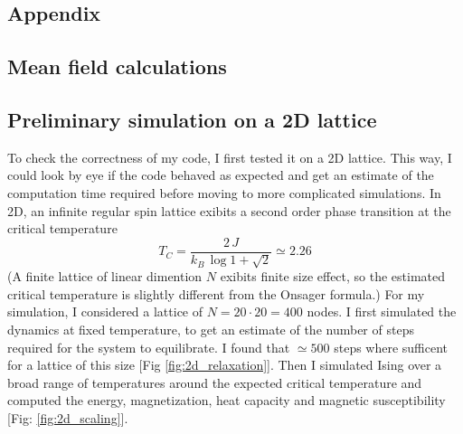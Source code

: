 \newpage
\subsection*{Appendix}
\subsection*{Mean field calculations} \label{app:mean_field}
{\small






}
\subsection*{Preliminary simulation on a 2D lattice}
{\small
To check the correctness of my code, I first tested it on a 2D lattice. This way, I could look by eye if the code behaved as expected and get an estimate of the computation time required before moving to more complicated simulations. 
In 2D, an infinite regular spin lattice exibits a second order phase transition at the critical
temperature 
\begin{equation}
T_C = \frac{2\,J}{k_B\,\log{1 + \sqrt{2}}} \simeq 2.26
  \end{equation}  
    \label{eq:onsager}
(A finite lattice of linear dimention $N$ exibits finite size effect, so the estimated critical temperature is slightly different from the Onsager formula.)
For my simulation, I considered a lattice of $N = 20 \cdot 20 = 400$ nodes. I first simulated the dynamics at fixed temperature, to get an estimate of the number of steps required for the system to equilibrate. I found that $\simeq 500$ steps where sufficent for a lattice of this size [Fig \ref{fig:2d_relaxation}]. Then I simulated Ising over a broad range of temperatures around the expected critical temperature and computed the energy, magnetization, heat capacity and magnetic susceptibility [Fig: \ref{fig:2d_scaling}].
}
